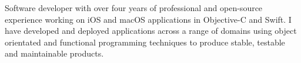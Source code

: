 %
Software developer with over four years of professional and open-source
experience working on iOS and macOS applications in Objective-C and Swift. I
have developed and deployed applications across a range of domains using object
orientated and functional programming techniques to produce stable, testable and
maintainable products.

\bigskip

